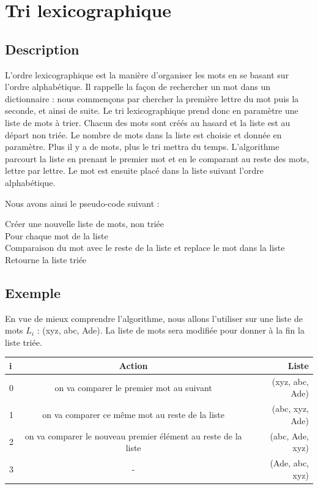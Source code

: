 \documentclass[12pt]{article}
\begin{document}
\pagebreak

\newpage
\section{Tri lexicographique}
\subsection{Description}

\hspace{1.0 cm} L'ordre lexicographique est la manière d'organiser les mots en se basant sur l'ordre alphabétique. Il rappelle la façon de rechercher un mot dans un dictionnaire : nous commençons par chercher la première lettre du mot puis la seconde, et ainsi de suite.
Le tri lexicographique prend donc en paramètre une liste de mots à trier. Chacun des mots sont créés au hasard et la liste est au départ non triée. Le nombre de mots dans la liste est choisie et donnée en paramètre. Plus il y a de mots, plus le tri mettra du temps. 
L'algorithme parcourt la liste en prenant le premier mot et en le comparant au reste des mots, lettre par lettre. Le mot est ensuite placé dans la liste suivant l'ordre alphabétique.

Nous avons ainsi le pseudo-code suivant :

\begin{tcolorbox}
Créer une nouvelle liste de mots, non triée \\
 

Pour chaque mot de la liste\\
\hspace*{1.0 cm} Comparaison du mot avec le reste de la liste et replace le mot dans la liste\\

Retourne la liste triée\\
\end{tcolorbox}

\subsection{Exemple}
\hspace{1.0 cm} En vue de mieux comprendre l'algorithme, nous allons l'utiliser sur une liste de mots $ L_{i} $ : (xyz, abc, Ade). La liste de mots sera modifiée pour donner à la fin la liste triée.

\vspace{0.5 cm}

\begin{tabular}{|l|c|r|}
  \hline
  i & Action & Liste \\
  \hline
  0 &		on va comparer le premier mot au suivant & (xyz, abc, Ade)\\
  1 &		on va comparer ce même mot au reste de la liste &	(abc, xyz, Ade)\\
  2 &		on va comparer le nouveau premier élément au reste de la liste &	(abc, Ade, xyz)\\
  3 &		 - &	(Ade, abc, xyz)\\
  \hline
\end{tabular}
\end{document}
